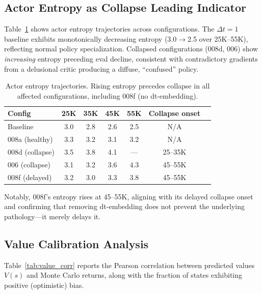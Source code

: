 \documentclass[10pt,letterpaper]{article}
\newcommand{\dt}{\Delta t}
\begin{document}
\subsection{Actor Entropy as Collapse Leading Indicator}\label{sec:entropy}

Table~\ref{tab:entropy} shows actor entropy trajectories across configurations.
The $\dt=1$ baseline exhibits monotonically decreasing entropy (3.0$\to$2.5 over 25K--55K), reflecting normal policy specialization.
Collapsed configurations (008d, 006) show \emph{increasing} entropy preceding eval decline, consistent with contradictory gradients from a delusional critic producing a diffuse, ``confused'' policy.

\begin{table}[t]
\centering
\caption{Actor entropy trajectories. Rising entropy precedes collapse in all affected configurations, including 008f (no dt-embedding).}
\label{tab:entropy}
\small
\begin{tabular}{lcccccl}
\toprule
Config & 25K & 35K & 45K & 55K & Collapse onset \\
\midrule
Baseline & 3.0 & 2.8 & 2.6 & 2.5 & N/A \\
008a (healthy) & 3.3 & 3.2 & 3.1 & 3.2 & N/A \\
008d (collapse) & 3.5 & 3.8 & 4.1 & --- & 25--35K \\
006 (collapse) & 3.1 & 3.2 & 3.6 & 4.3 & 45--55K \\
008f (delayed) & 3.2 & 3.0 & 3.3 & 3.8 & 45--55K \\
\bottomrule
\end{tabular}
\end{table}

Notably, 008f's entropy rises at 45--55K, aligning with its delayed collapse onset and confirming that removing dt-embedding does not prevent the underlying pathology---it merely delays it.

\subsection{Value Calibration Analysis}\label{sec:value_dist}

Table~\ref{tab:value_corr} reports the Pearson correlation between predicted values $V(s)$ and Monte Carlo returns, along with the fraction of states exhibiting positive (optimistic) bias.
\end{document}
